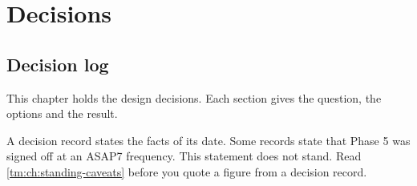 \part{Decisions}\label{tm:part:decisions}

\chapter{Decision log}\label{tm:ch:decision-log}

This chapter holds the design decisions. Each section gives the question, the options and the result.

\begin{information}
A decision record states the facts of its date. Some records state that Phase 5 was signed off at an ASAP7 frequency. This statement does not stand. Read \cref{tm:ch:standing-caveats} before you quote a figure from a decision record.
\end{information}

